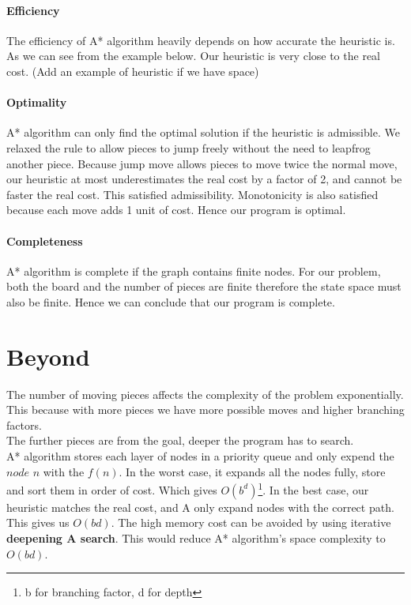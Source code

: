 \documentclass[11pt,a4paper]{article}
\begin{document}
        \paragraph{Efficiency} The efficiency of A* algorithm heavily depends on how accurate the heuristic is. As we can see from the example below. Our heuristic is very close to the real cost. (Add an example of heuristic if we have space) 
        \paragraph{Optimality} A* algorithm can only find the optimal solution if the heuristic is admissible. We relaxed the rule to allow pieces to jump freely without the need to leapfrog another piece. Because jump move allows pieces to move twice the normal move, our heuristic at most underestimates the real cost by a factor of 2, and cannot be faster the real cost. This satisfied admissibility. Monotonicity is also satisfied because each move adds 1 unit of cost. Hence our program is optimal.
        \paragraph{Completeness} A* algorithm is complete if the graph contains finite nodes. For our problem, both the board and the number of pieces are finite therefore the state space must also be finite. Hence we can conclude that our program is complete.
    \section{Beyond}
        The number of moving pieces affects the complexity of the problem exponentially. This because with more pieces we have more possible moves and higher branching factors.\\
        The further pieces are from the goal, deeper the program has to search.\\
        A* algorithm stores each layer of nodes in a priority queue and only expend the $node$ $n$ with the $f(n)$. In the worst case, it expands all the nodes fully, store and sort them in order of cost. Which gives $O(b^d)$\footnote{b for branching factor, d for depth}. In the best case, our heuristic matches the real cost, and A only expand nodes with the correct path. This gives us $O(bd)$. The high memory cost can be avoided by using iterative \textbf{deepening A search}. This would reduce A* algorithm's space complexity to $O(bd)$.
        
\end{document}
